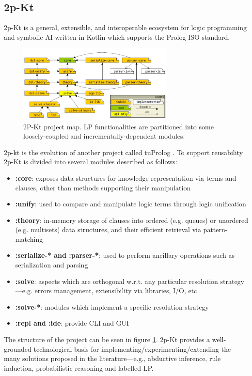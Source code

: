 \subsection{2p-Kt}\label{subsec:2p_kt}

2p-Kt is a general, extensible, and interoperable ecosystem for logic programming and symbolic AI written in Kotlin which supports the Prolog ISO standard.\newline
\begin{figure}[h]
    \centering
    \includegraphics[width=0.70\textwidth]{images/2p_kt.jpg}
    \caption{2P-Kt project map. LP functionalities are partitioned into some loosely-coupled and incrementally-dependent modules.}
    \label{fig:2p_kt}
\end{figure}
2p-kt is the evolution of another project called tuProlog \cite{CIATTO2021100817}. To support reusability 2p-Kt is divided into several modules described as follows:
\begin{itemize}
    \item \textbf{:core}: exposes data structures for knowledge representation via terms and clauses, other than methods supporting their manipulation
    \item \textbf{:unify}: used to compare and manipulate logic terms through logic unification
    \item \textbf{:theory}: in-memory storage of clauses into ordered (e.g. queues) or unordered (e.g. multisets) data structures, and their efficient retrieval via pattern-matching
    \item \textbf{:serialize-* and :parser-*}: used to perform ancillary operations such as serialization and parsing
    \item \textbf{:solve}: aspects which are orthogonal w.r.t. any particular resolution strategy—e.g. errors management, extensibility via libraries, I/O, etc
    \item \textbf{:solve-*}: modules which implement a specific resolution strategy
    \item \textbf{:repl and :ide}: provide CLI and GUI
\end{itemize}
The structure of the project can be seen in figure \ref{fig:2p_kt}.\newline
2p-Kt provides a well-grounded technological basis for implementing/experimenting/extending the many solutions proposed in the literature—e.g., abductive
inference, rule induction, probabilistic reasoning and labelled LP.